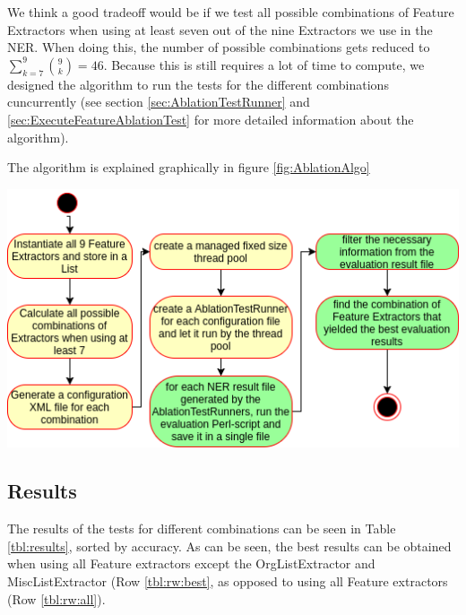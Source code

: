 \documentclass[11pt, english]{article}
\begin{document}
We think a good tradeoff would be if we test all possible combinations of Feature Extractors when using at least seven out of the nine Extractors we use in the NER. When doing this, the number of possible combinations gets reduced to $\sum_{k=7}^{9}\binom{9}{k} = 46$. Because this is still requires a lot of time to compute, we designed the algorithm to run the tests for the different combinations cuncurrently (see section \ref{sec:AblationTestRunner} and \ref{sec:ExecuteFeatureAblationTest} for more detailed information about the algorithm).

The algorithm is explained graphically in figure \ref{fig:AblationAlgo}

\includegraphics[scale=0.75]{gfx/ablationAlgo.png}
\label{fig:AblationAlgo}

\subsection{Results}
\label{sec:AblationResult}
The results of the tests for different combinations can be seen in Table \ref{tbl:results}, sorted by accuracy.
As can be seen, the best results can be obtained when using all Feature extractors except the OrgListExtractor and MiscListExtractor (Row \ref{tbl:rw:best}, as opposed to using all Feature extractors (Row \ref{tbl:rw:all}).
\end{document}
